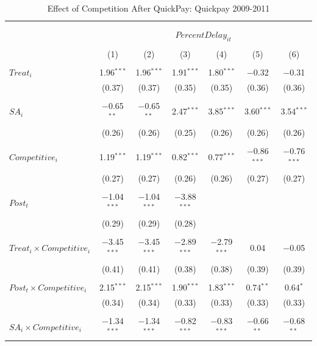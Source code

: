 \documentclass[
]{article}
\begin{document}
\begin{table}[H] \centering 
  \caption{Effect of Competition After QuickPay: Quickpay 2009-2011} 
  \label{} 
\small 
\begin{tabular}{@{\extracolsep{-3pt}}lcccccc} 
\\[-1.8ex]\hline 
\hline \\[-1.8ex] 
\\[-1.8ex] & \multicolumn{6}{c}{$PercentDelay_{it}$  } \\ 
\\[-1.8ex] & (1) & (2) & (3) & (4) & (5) & (6)\\ 
\hline \\[-1.8ex] 
 $Treat_i$ & 1.96$^{***}$ & 1.96$^{***}$ & 1.91$^{***}$ & 1.80$^{***}$ & $-$0.32 & $-$0.31 \\ 
  & (0.37) & (0.37) & (0.35) & (0.35) & (0.36) & (0.36) \\ 
  & & & & & & \\ 
 $SA_i$ & $-$0.65$^{**}$ & $-$0.65$^{**}$ & 2.47$^{***}$ & 3.85$^{***}$ & 3.60$^{***}$ & 3.54$^{***}$ \\ 
  & (0.26) & (0.26) & (0.25) & (0.26) & (0.26) & (0.26) \\ 
  & & & & & & \\ 
 $Competitive_i$ & 1.19$^{***}$ & 1.19$^{***}$ & 0.82$^{***}$ & 0.77$^{***}$ & $-$0.86$^{***}$ & $-$0.76$^{***}$ \\ 
  & (0.27) & (0.27) & (0.26) & (0.26) & (0.27) & (0.27) \\ 
  & & & & & & \\ 
 $Post_t$ & $-$1.04$^{***}$ & $-$1.04$^{***}$ & $-$3.88$^{***}$ &  &  &  \\ 
  & (0.29) & (0.29) & (0.28) &  &  &  \\ 
  & & & & & & \\ 
 $Treat_i \times Competitive_i$ & $-$3.45$^{***}$ & $-$3.45$^{***}$ & $-$2.89$^{***}$ & $-$2.79$^{***}$ & 0.04 & $-$0.05 \\ 
  & (0.41) & (0.41) & (0.38) & (0.38) & (0.39) & (0.39) \\ 
  & & & & & & \\ 
 $Post_t \times Competitive_i$ & 2.15$^{***}$ & 2.15$^{***}$ & 1.90$^{***}$ & 1.83$^{***}$ & 0.74$^{**}$ & 0.64$^{*}$ \\ 
  & (0.34) & (0.34) & (0.33) & (0.33) & (0.33) & (0.33) \\ 
  & & & & & & \\ 
 $SA_i \times Competitive_i$ & $-$1.34$^{***}$ & $-$1.34$^{***}$ & $-$0.82$^{***}$ & $-$0.83$^{***}$ & $-$0.66$^{**}$ & $-$0.68$^{**}$ \\ 

\end{tabular}
\end{table}
\end{document}
